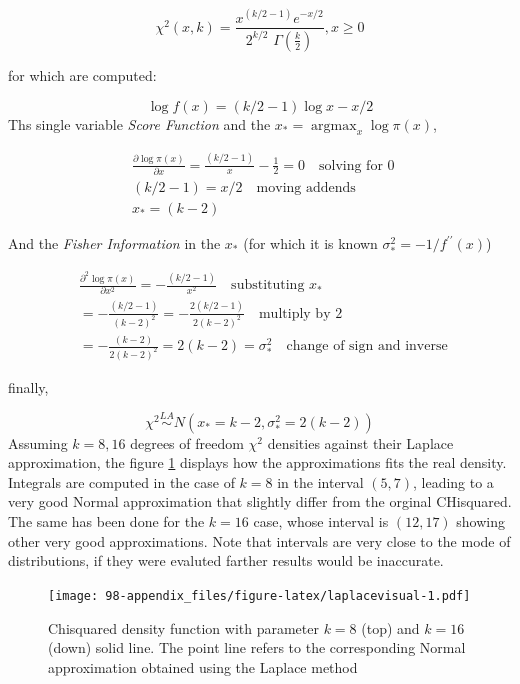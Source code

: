\documentclass[
  12pt,
  a4paper,
  oneside]{book}
\theoremstyle{definition}
\theoremstyle{definition}
\theoremstyle{definition}
\theoremstyle{remark}
\begin{document}
\[
\chi^{2}(x,k)=\frac{x^{(k / 2-1)} e^{-x / 2}}{2^{k / 2} \,\, \Gamma\left(\frac{k}{2}\right)}, x \geq 0
\]

for which are computed:

\[
\log f(x)=(k / 2-1) \log x-x / 2
\]
Ths single variable \emph{Score Function} and the \(x_{*}=\operatorname{argmax}_{x} \log \pi(x)\),

\begin{equation}
\begin{aligned} 
  &\frac{\partial \log \pi(x)}{\partial x}= \frac{(k/2 -1)}{x} - \frac{1}{2} =0 \quad \text {solving for 0 }\\
  &(k/2-1) = x/2\quad \text {moving addends}\\
  &x_* = (k-2) 
\end{aligned}
\end{equation}

And the \emph{Fisher Information} in the \(x_*\) (for which it is known \(\sigma^{2}_*=-1 / f^{\prime \prime}(x)\))

\begin{equation} 
\begin{split}
  &\frac{\partial^2 \log \pi(x)}{\partial x^2}=-\frac{(k / 2-1) }{x^{2}} \quad \text {substituting} \,\,x_* \\
  &= -\frac{(k / 2-1) }{(k-2)^{2}} = - \frac{2(k/2-1)}{2(k-2)^{2}} \quad \text {multiply by 2 } \\
  &=-  \frac{(k-2)}{2(k-2)^{2}} = 2(k-2)  = \sigma^{2}_*\quad \text {change of sign and inverse }
\end{split}
\end{equation}

finally,

\[
\chi^{2} \stackrel{L A}{\sim} N\left(x_*=k-2, \sigma^{2}_*=2(k-2)\right)
\]
Assuming \(k = 8, 16\) degrees of freedom \(\chi^{2}\) densities against their Laplace approximation, the figure \ref{fig:laplacevisual} displays how the approximations fits the real density. Integrals are computed in the case of \(k = 8\) in the interval \((5, 7)\), leading to a very good Normal approximation that slightly differ from the orginal CHisquared. The same has been done for the \(k = 16\) case, whose interval is \((12, 17)\) showing other very good approximations. Note that intervals are very close to the mode of distributions, if they were evaluted farther results would be inaccurate.

\begin{figure}
\centering
\texttt{[image: 98-appendix\_files/figure-latex/laplacevisual-1.pdf]}
\caption{\label{fig:laplacevisual}Chisquared density function with parameter \(k = 8\) (top) and \(k = 16\) (down) solid line. The point line refers to the corresponding Normal approximation obtained using the Laplace method}
\end{figure}

  
\end{document}
